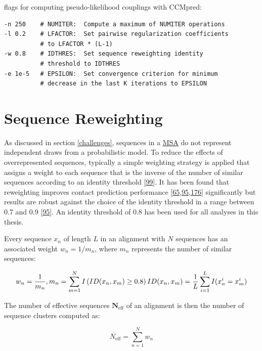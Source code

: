 \documentclass[11pt,a4paper,twoside]{book}
\newcommand{\neff}{N_\mathrm{eff}}
\theoremstyle{definition}
\theoremstyle{definition}
\theoremstyle{remark}
\begin{document}
flags for computing pseudo-likelihood couplings with CCMpred:

\begin{verbatim}
-n 250    # NUMITER:  Compute a maximum of NUMITER operations
-l 0.2    # LFACTOR:  Set pairwise regularization coefficients 
          # to LFACTOR * (L-1) 
-w 0.8    # IDTHRES:  Set sequence reweighting identity 
          # threshold to IDTHRES
-e 1e-5   # EPSILON:  Set convergence criterion for minimum 
          # decrease in the last K iterations to EPSILON
\end{verbatim}

\section{Sequence Reweighting}\label{seq-reweighting}

As discussed in section \ref{challenges}, sequences in a
\protect\hyperlink{abbrev}{MSA} do not represent independent draws from
a probabilistic model. To reduce the effects of overrepresented
sequences, typically a simple weighting strategy is applied that assigns
a weight to each sequence that is the inverse of the number of similar
sequences according to an identity threshold
{[}\protect\hyperlink{ref-Stein2015a}{99}{]}. It has been found that
reweighting improves contact prediction performance
{[}\protect\hyperlink{ref-Jones2012}{65},\protect\hyperlink{ref-Morcos2011}{95},\protect\hyperlink{ref-Buslje2009}{176}{]}
significantly but results are robust against the choice of the identity
threshold in a range between 0.7 and 0.9
{[}\protect\hyperlink{ref-Morcos2011}{95}{]}. An identity threshold of
0.8 has been used for all analyses in this thesis.

Every sequence \(x_n\) of length \(L\) in an alignment with \(N\)
sequences has an associated weight \(w_n = 1/m_n\), where \(m_n\)
represents the number of similar sequences:

\begin{equation} 
  w_n = \frac{1}{m_n}, m_n = \sum_{m=1}^N I \left( ID(x_n, x_m) \geq 0.8 \right) \\
  ID(x_n, x_m)=\frac{1}{L} \sum_{i=1}^L I(x_n^i = x_m^i)
  \label{eq:seqweight}
\end{equation}

The number of effective sequences \(\mathbf{\neff}\) of an alignment is
then the number of sequence clusters computed as:

\begin{equation} 
  \neff = \sum_{n=1}^N w_n
  \label{eq:neff}
\end{equation}
\end{document}
